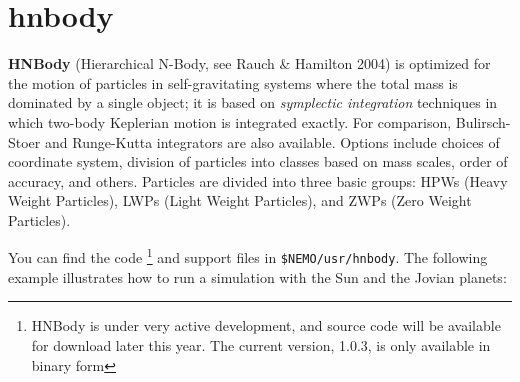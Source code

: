 
\section{hnbody}

{\bf HNBody} (Hierarchical N-Body, see Rauch \& Hamilton 2004)
is optimized for 
the motion of particles in self-gravitating systems where the total mass
is dominated by a single object; it is based on 
{\it symplectic integration} techniques 
in which two-body Keplerian motion is integrated exactly. 
For comparison, 
Bulirsch-Stoer and Runge-Kutta integrators are also available.
Options include choices of coordinate system, division of particles into classes 
based on mass scales, order of accuracy, and others. 
Particles are divided into three basic groups:
HPWs (Heavy Weight Particles), LWPs (Light Weight Particles), and
ZWPs (Zero Weight Particles).

You can find the code
\footnote{HNBody is under very active development, and source code will be 
available for download later this year. The current version, 1.0.3, is only
available in binary form}
and support files in {\tt \$NEMO/usr/hnbody}. The following example illustrates
how to run a simulation with the Sun and the Jovian planets:

